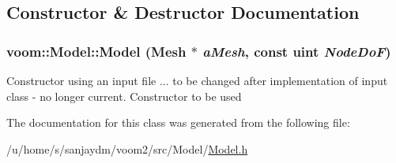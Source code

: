\subsection{Constructor \& Destructor Documentation}
\hypertarget{classvoom_1_1_model_aa9d7f41277483cb4141fcbb7556871a6}{
\subsubsection[{Model}]{\setlength{\rightskip}{0pt plus 5cm}voom::Model::Model ({\bf Mesh} $\ast$ {\em aMesh}, \/  const uint {\em NodeDoF})}}
\label{classvoom_1_1_model_aa9d7f41277483cb4141fcbb7556871a6}


Constructor using an input file ... to be changed after implementation of input class -\/ no longer current. Constructor to be used 

The documentation for this class was generated from the following file:\begin{DoxyCompactItemize}
\item 
/u/home/s/sanjaydm/voom2/src/Model/\hyperlink{_model_8h}{Model.h}\end{DoxyCompactItemize}
